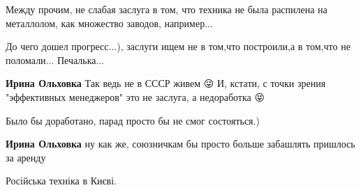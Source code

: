 \begin{itemize}
 
Между прочим, не слабая заслуга в том, что техника не была распилена на
металлолом, как множество заводов, например...

\begin{itemize}
 
До чего дошел прогресс...), заслуги ищем не в том,что построили,а в том,что не поломали... Печалька...

 
\textbf{Ирина Ольховка} Так ведь не в СССР живем 😜
И, кстати, с точки зрения "эффективных менеджеров" это не заслуга, а недоработка 😝

 
Было бы доработано, парад просто бы не смог состояться.)

 
\textbf{Ирина Ольховка} ну как же, союзничкам бы просто больше забашлять пришлось за аренду
\end{itemize}

 
Російська техніка в Києві.

\begin{itemize}
 

\end{itemize}
\end{itemize}

